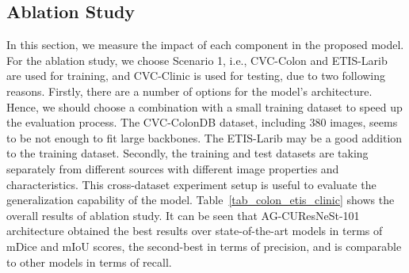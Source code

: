 \documentclass[review, sort&compress]{elsarticle}
\begin{document}
	\subsection{Ablation Study}
	In this section, we measure the impact of each component in the proposed model. For the ablation study, we choose Scenario 1, i.e., CVC-Colon and ETIS-Larib are used for training, and CVC-Clinic is used for testing, due to two following reasons. Firstly, there are a number of options for the model's architecture. Hence, we should choose a combination with a small training dataset to speed up the evaluation process. The CVC-ColonDB dataset, including 380 images, seems to be not enough to fit large backbones. The ETIS-Larib may be a good addition to the training dataset. Secondly, the training and test datasets are taking separately from different sources with different image properties and characteristics. This cross-dataset experiment setup is useful to evaluate the generalization capability of the model. Table~\ref{tab_colon_etis_clinic} shows the overall results of ablation study. It can be seen that AG-CUResNeSt-101 architecture obtained the best results over state-of-the-art models in terms of mDice and mIoU scores, the second-best in terms of precision, and is comparable to other models in terms of recall.  
	
\end{document}
